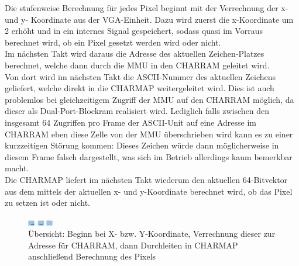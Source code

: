 Die stufenweise Berechnung f\"ur jedes Pixel beginnt mit der Verrechnung der x- und y- Koordinate aus der VGA-Einheit. Dazu wird zuerst die x-Koordinate um 2 erh\"oht und in ein internes Signal gespeichert, sodass quasi im Vorraus berechnet wird, ob ein Pixel gesetzt werden wird oder nicht.\\
Im n\"achsten Takt wird daraus die Adresse des aktuellen Zeichen-Platzes berechnet, welche dann durch die MMU in den CHARRAM geleitet wird.\\
Von dort wird im n\"achsten Takt die ASCII-Nummer des aktuellen Zeichens geliefert, welche direkt in die CHARMAP weitergeleitet wird. Dies ist auch problemlos bei gleichzeitigem Zugriff der MMU auf den CHARRAM m\"oglich, da dieser als Dual-Port-Blockram realisiert wird. Lediglich falls zwischen den insgesamt 64 Zugriffen pro Frame der ASCII-Unit auf eine Adresse im CHARRAM eben diese Zelle von der MMU \"uberschrieben wird kann es zu einer kurzzeitigen St\"orung kommen: Dieses Zeichen w\"urde dann m\"oglicherweise in diesem Frame falsch dargestellt, was sich im Betrieb allerdings kaum bemerkbar macht.\\
Die CHARMAP liefert im n\"achsten Takt wiederum den aktuellen 64-Bitvektor aus dem mittels der aktuellen x- und y-Koordinate berechnet wird, ob das Pixel zu setzen ist oder nicht.\\
\begin{figure}[H]
	\centering
		\includegraphics[width=0.1\textwidth]{ASCII.png}
	\caption{Übersicht: Beginn bei X- bzw. Y-Koordinate, Verrechnung dieser zur Adresse für CHARRAM, dann Durchleiten in CHARMAP anschließend Berechnung des Pixels}
	\label{fig:pixels}
\end{figure}

